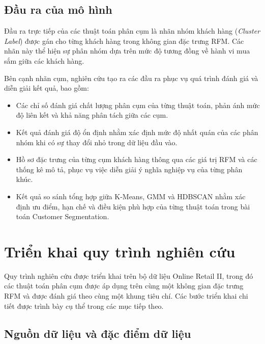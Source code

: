 \documentclass[12pt]{ai_conquer2026}
\begin{document}
\subsection{Đầu ra của mô hình}

Đầu ra trực tiếp của các thuật toán phân cụm là nhãn nhóm khách hàng (\textit{Cluster Label}) được gán cho từng khách hàng trong không gian đặc trưng RFM. Các nhãn này thể hiện sự phân nhóm dựa trên mức độ tương đồng về hành vi mua sắm giữa các khách hàng.

Bên cạnh nhãn cụm, nghiên cứu tạo ra các đầu ra phục vụ quá trình đánh giá và diễn giải kết quả, bao gồm:

\begin{itemize}

    \item Các chỉ số đánh giá chất lượng phân cụm của từng thuật toán, phản ánh mức độ liên kết và khả năng phân tách giữa các cụm.

    \item Kết quả đánh giá độ ổn định nhằm xác định mức độ nhất quán của các phân nhóm khi có sự thay đổi nhỏ trong dữ liệu đầu vào.

    \item Hồ sơ đặc trưng của từng cụm khách hàng thông qua các giá trị RFM và các thống kê mô tả, phục vụ việc diễn giải ý nghĩa nghiệp vụ của từng phân khúc.

    \item Kết quả so sánh tổng hợp giữa K-Means, GMM và HDBSCAN nhằm xác định ưu điểm, hạn chế và điều kiện phù hợp của từng thuật toán trong bài toán Customer Segmentation.

\end{itemize}
\section{Triển khai quy trình nghiên cứu}

Quy trình nghiên cứu được triển khai trên bộ dữ liệu Online Retail II, trong đó các thuật toán phân cụm được áp dụng trên cùng một không gian đặc trưng RFM và được đánh giá theo cùng một khung tiêu chí. Các bước triển khai chi tiết được trình bày cụ thể trong các mục tiếp theo.

\subsection{Nguồn dữ liệu và đặc điểm dữ liệu}
\end{document}
